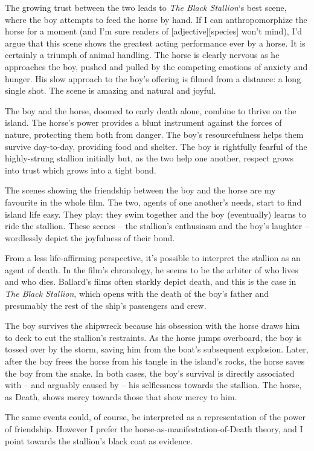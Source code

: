 The growing trust between the two leads to \textit{The Black Stallion}‘s best scene, where the boy attempts to feed the horse by hand. If I can anthropomorphize the horse for a moment (and I'm sure readers of [adjective][species] won't mind), I'd argue that this scene shows the greatest acting performance ever by a horse. It is certainly a triumph of animal handling. The horse is clearly nervous as he approaches the boy, pushed and pulled by the competing emotions of anxiety and hunger. His slow approach to the boy's offering is filmed from a distance: a long single shot. The scene is amazing and natural and joyful.

The boy and the horse, doomed to early death alone, combine to thrive on the island. The horse's power provides a blunt instrument against the forces of nature, protecting them both from danger. The boy's resourcefulness helps them survive day-to-day, providing food and shelter. The boy is rightfully fearful of the highly-strung stallion initially but, as the two help one another, respect grows into trust which grows into a tight bond.

The scenes showing the friendship between the boy and the horse are my favourite in the whole film. The two, agents of one another's needs, start to find island life easy. They play: they swim together and the boy (eventually) learns to ride the stallion. These scenes -- the stallion's enthusiasm and the boy's laughter -- wordlessly depict the joyfulness of their bond.

From a less life-affirming perspective, it's possible to interpret the stallion as an agent of death. In the film's chronology, he seems to be the arbiter of who lives and who dies. Ballard's films often starkly depict death, and this is the case in \textit{The Black Stallion}, which opens with the death of the boy's father and presumably the rest of the ship's passengers and crew.

The boy survives the shipwreck because his obsession with the horse draws him to deck to cut the stallion's restraints. As the horse jumps overboard, the boy is tossed over by the storm, saving him from the boat's subsequent explosion. Later, after the boy frees the horse from his tangle in the island's rocks, the horse saves the boy from the snake. In both cases, the boy's survival is directly associated with -- and arguably caused by -- his selflessness towards the stallion. The horse, as Death, shows mercy towards those that show mercy to him.

The same events could, of course, be interpreted as a representation of the power of friendship. However I prefer the horse-as-manifestation-of-Death theory, and I point towards the stallion's black coat as evidence.

